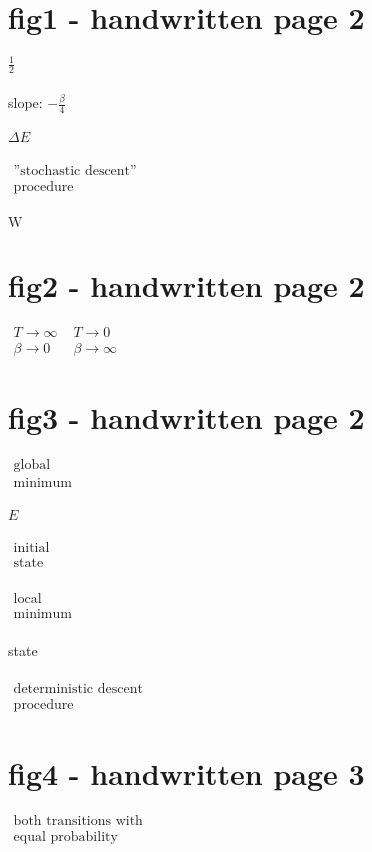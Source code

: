 \documentclass[a4paper,11pt]{article}
\begin{document}
\renewcommand{\vec}[1]{\ensuremath{\underline{\mathbf{#1}}}}
\newcommand{\corresponds}{\ensuremath{\widehat{=}}}

\section{fig1 - handwritten page 2}
$\frac{1}{2}$ \\\\
slope: $-\frac{\beta}{4}$ \\\\
$\Delta E$ \\\\
$\substack{	\text{''stochastic descent''} \\ \text{procedure} }$ \\\\
$\mathrm{W}$

\section{fig2 - handwritten page 2}
$\substack{ 	T \rightarrow \infty \\
		\beta \rightarrow 0 }$
$\substack{ 	T \rightarrow 0 \\
		\beta \rightarrow \infty }$

\section{fig3 - handwritten page 2}
$\substack{ \text{global} \\ \text{minimum}}$ \\\\
$E$ \\\\
$\substack{ \text{initial} \\ \text{state}}$ \\\\
$\substack{ \text{local} \\ \text{minimum}}$ \\\\
state \\\\
$\substack{ \text{deterministic descent} \\ \text{procedure} }$

\section{fig4 - handwritten page 3}
$\substack{ 	\text{both transitions with} \\
		\text{equal probability}}$
\end{document}
